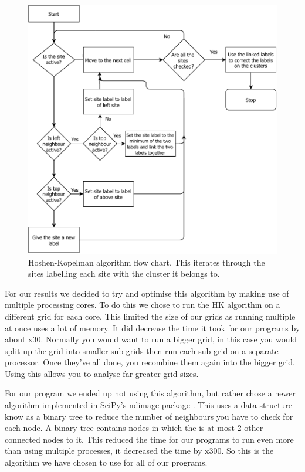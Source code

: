 \documentclass[%
 reprint,
 amsmath,amssymb,
 aps,
]{revtex4-2}
\begin{document}
\begin{figure}[H]
    \centering
    \includegraphics[width=\linewidth]{report/assets/hk_algroithm.pdf}
    \caption{Hoshen-Kopelman algorithm flow chart. This iterates through the sites labelling each site with the cluster it belongs to. }
    \label{fig:hk_flow}
\end{figure}

For our results we decided to try and optimise this algorithm by making use of multiple processing cores. To do this we chose to run the HK algorithm on a different grid for each core. This limited the size of our grids as running multiple at once uses a lot of memory. It did decrease the time it took for our programs by about x30. Normally you would want to run a bigger grid, in this case you would split up the grid into smaller sub grids then run each sub grid on a separate processor. Once they've all done, you recombine them again into the bigger grid. Using this allows you to analyse far greater grid sizes.

For our program we ended up not using this algorithm, but rather chose a newer algorithm implemented in SciPy's ndimage package \cite{scipy_community_multidimensional_nodate}. This uses a data structure know as a binary tree to reduce the number of neighbours you have to check for each node. A binary tree contains nodes in which the is at most 2 other connected nodes to it. This reduced the time for our programs to run even more than using multiple processes, it decreased the time by x300. So this is the algorithm we have chosen to use for all of our programs.
\end{document}
